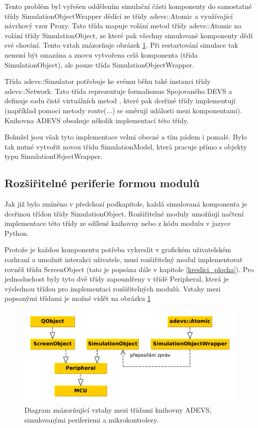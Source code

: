 Tento problém byl vyřešen oddělením simulační části komponenty do samostatné třídy SimulationObjectWrapper dědící ze třídy adevs::Atomic a využívající návrhový vzor Proxy. Tato třída mapuje volání metod třídy adevs::Atomic na volání třídy SimulationObject, ze které pak všechny simulované komponenty dědí
své chování. Tento vztah znázorňuje obrázek \ref{fig:adevs_classes}. Při restartování simulace tak nemusí být smazána a znovu vytvořena celá komponenta (třída SimulationObject), ale pouze třída SimulationObjectWrapper.

Třída adevs::Simulator potřebuje ke svému běhu také instanci třídy adevs::Network. Tato třída reprezentuje formalismus Spojovaného DEVS a definuje sadu čistě virtuálních metod \cite{oop}, které pak dceřiné třídy implementují (například pomocí metody route(...) se směrují události mezi komponentami). Knihovna ADEVS obsahuje několik implementací této třídy.

Bohužel jsou však tyto implementace velmi obecné a tím pádem i pomalé. Bylo tak nutné vytvořit novou třídu SimulationModel, která pracuje přímo s objekty typu SimulationObjectWrapper.

\subsection{Rozšiřitelné periferie formou modulů}

Jak již bylo zmíněno v předchozí podkapitole, každá simulovaná komponenta je dceřinou třídou třídy SimulationObject. Rozšiřitelné moduly umožňují načtení implementace této třídy ze sdílené knihovny nebo z kódu modulu v jazyce Python.

Protože je každou komponentu potřeba vykreslit v grafickém uživatelském rozhraní a umožnit interakci uživatele, musí rozšiřitelný modul implementovat rovněž třídu ScreenObject (tato je popsána dále v kapitole \ref{kreslici_plocha}). Pro jednoduchost byly tyto dvě třídy zapouzdřeny v třídě Peripheral, která je výslednou třídou pro implementaci rozšiřitelných modulů. Vztahy mezi popsanými třídami je možné vidět na obrázku \ref{fig:adevs_classes}

\begin{figure}[ht]
\centering
\includegraphics[trim=0cm 0cm 0cm 0cm, scale=0.7]{fig/adevs_class}
\caption{Diagram znázorňující vztahy mezi třídami knihovny ADEVS, simulovanými periferiemi a mikrokontrolery.}
\label{fig:adevs_classes}
\end{figure}

